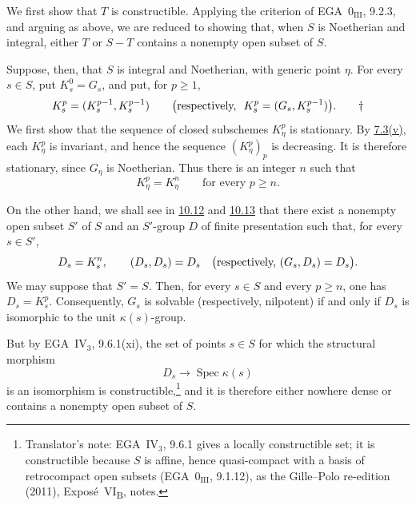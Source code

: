 We first show that \(T\) is constructible. Applying the
criterion of EGA~0\(_{\mathrm{III}}\), 9.2.3, and arguing as
above, we are reduced to showing that, when \(S\) is
Noetherian and integral, either \(T\) or \(S-T\) contains a
nonempty open subset of \(S\).

Suppose, then, that \(S\) is integral and Noetherian, with
generic point \(\eta\). For every \(s\in S\), put
\(K_s^0=G_s\), and put, for \(p\geq1\),
\label{form:sga3-VIB-8.4-Ksp}%
\[
  K_s^p=(K_s^{p-1},K_s^{p-1})
  \qquad
  \bigl(\textup{respectively, }\
    K_s^p=(G_s,K_s^{p-1})\bigr).
\tag*{\(\dagger\)}
\]
\begingroup
\renewcommand{\thefootnote}{\fnsymbol{footnote}}%
%
\endgroup
We first show that the sequence of closed subschemes
\(K_\eta^p\) is stationary. By
\hyperref[concl:sga3-VIB-7.3-v]{7.3\textup{(v)}}, each
\(K_\eta^p\) is invariant, and hence the sequence
\((K_\eta^p)_p\) is decreasing. It is therefore stationary,
since \(G_\eta\) is Noetherian. Thus there is an integer \(n\)
such that
\label{form:sga3-VIB-8.4-stationary}%
\[
  K_\eta^p=K_\eta^n
  \qquad\text{for every }p\geq n.
\]

On the other hand, we shall see in
\hyperref[prop:sga3-VIB-10.12]{10.12} and
\hyperref[cor:sga3-VIB-10.13]{10.13} that there exist a
nonempty open subset \(S'\) of \(S\) and an \(S'\)-group \(D\)
of finite presentation such that, for every \(s\in S'\),
\label{form:sga3-VIB-8.4-D-fibers}%
\[
  D_s=K_s^n,
  \qquad
  (D_s,D_s)=D_s
  \quad
  \bigl(\textup{respectively, }(G_s,D_s)=D_s\bigr).
\]
We may suppose that \(S'=S\). Then, for every \(s\in S\) and
every \(p\geq n\), one has \(D_s=K_s^p\). Consequently, \(G_s\)
is solvable (respectively, nilpotent) if and only if \(D_s\)
is isomorphic to the unit \(\kappa(s)\)-group.

But by EGA~IV\(_3\), 9.6.1\textup{(xi)}, the set of points
\(s\in S\) for which the structural morphism
\[
  D_s\longrightarrow\operatorname{Spec}\kappa(s)
\]
is an isomorphism is constructible,\footnote{Translator's note: EGA~IV\(_3\), 9.6.1 gives a locally
constructible set; it is constructible because \(S\) is affine, hence quasi-compact with a basis of
retrocompact open subsets (EGA~\(0_{\mathrm{III}}\), 9.1.12), as the Gille--Polo re-edition (2011),
Exposé~VI\textsubscript{B}, notes.} and it is therefore either
nowhere dense or contains a nonempty open subset of \(S\).

